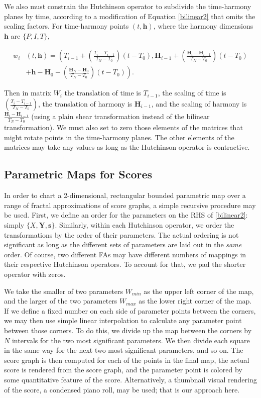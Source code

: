 \documentclass[english,11pt,letterpaper,onecolumn]{scrartcl}
\numberwithin{equation}{section}
\begin{document}
We also must constrain the Hutchinson operator to subdivide the time-harmony
planes by time, according to a modification of Equation \eqref{bilinear2} that
omits the scaling factors. For time-harmony points $(t,\mathbf{h})$, where the
harmony dimensions $\mathbf{h}$ are $\{P, I, T \}$,

\begin{align}
w_{i} &  (t,\mathbf{h})= \left(T_{i-1}+ \left(  \frac{T_{i}-T_{i-1}}{T_{N}-T_{0}}\right)
(t-T_{0}),\mathbf{H}_{i-1}+\left(  \frac{\mathbf{H}_{i}-\mathbf{H}_{i-1}}{T_{N}-T_{0}%
}\right)  (t-T_{0})\right.\label{affine}\\
& \left. +   \mathbf{h}-\mathbf{H}_{0}-\left(  \frac{\mathbf{H}_{N}-\mathbf{H}_{0}}{T_{N}-T_{0}%
}\right)  (t-T_{0})\right)  .\nonumber
\end{align}

\noindent Then in matrix $W_i$ the translation of time is $T_{i-1}$, the scaling
of time is $\left(  \frac{T_{i}-T_{i-1}}{T_{N}-T_{0}}\right)$, the translation
of harmony is $\mathbf{H}_{i-1}$, and the scaling of harmony is
$\frac{\mathbf{H}_{i}-\mathbf{H}_{i-1}}{T_{N}-T_{0}}$ (using a plain shear
transformation instead of the bilinear transformation). We must also set to zero
those elements of the matrices that might rotate points in the time-harmony
planes. The other elements of the matrices may take any values as long as the
Hutchinson operator is contractive.


\subsection{Parametric Maps for Scores}

In order to chart a 2-dimensional, rectangular bounded parametric map over a
range of fractal approximations of score graphs, a simple recursive procedure
may be used. First, we define an order for the parameters on the RHS of
\eqref{bilinear2}: simply $\{X, \mathbf{Y}, \mathbf{s}\}$. Similarly, within
each Hutchinson operator, we order the transformations by the order of their
parameters. The actual ordering is not significant as long as the different sets
of parameters are laid out in the \textit{same} order. Of course, two different
FAs may have different numbers of mappings in their respective Hutchinson
operators. To account for that, we pad the shorter operator with zeros.

We take the smaller of two parameters $W_{min}$ as the upper left corner of the
map, and the larger of the two parameters $W_{max}$ as the lower right corner of
the map. If we define a fixed number on each side of parameter points between
the corners, we may then use simple linear interpolation to calculate any
parameter point between those corners. To do this, we divide up the map between
the corners by $N$ intervals for the two most significant parameters. We then
divide each square in the same way for the next two most significant parameters,
and so on. The score graph is then computed for each of the points in the final
map, the actual score is rendered from the score graph, and the parameter point
is colored by some quantitative feature of the score. Alternatively, a thumbnail
visual rendering of the score, a condensed piano roll, may be used; that is our
approach here.
\end{document}
